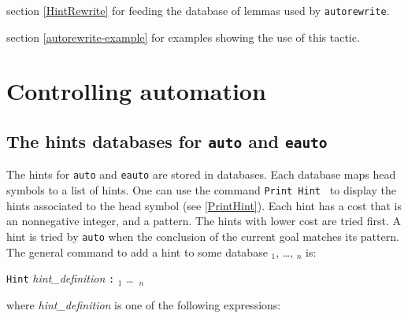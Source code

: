 \SeeAlso section \ref{HintRewrite} for feeding the database of lemmas used by {\tt autorewrite}.

\SeeAlso section \ref{autorewrite-example} for examples showing the use of
this tactic. 


\section{Controlling automation}

\subsection{The hints databases for {\tt auto} and {\tt eauto}
\label{Hints-databases}
}

The hints for \texttt{auto} and \texttt{eauto} are stored in
databases.  Each database maps head symbols to a list of hints. One can
use the command \texttt{Print Hint \ident} to display the hints
associated to the head symbol \ident{} (see \ref{PrintHint}). Each
hint has a cost that is an nonnegative integer, and a pattern. 
The hints with lower cost are tried first. A hint is tried by 
\texttt{auto} when the conclusion of the current goal
matches its pattern. The general
command to add a hint to some database \ident$_1$, \dots, \ident$_n$ is:
\begin{tabbing}
  \texttt{Hint} \textsl{hint\_definition} \texttt{:} \ident$_1$ \ldots\ \ident$_n$
\end{tabbing}
where {\sl hint\_definition} is one of the following expressions:

